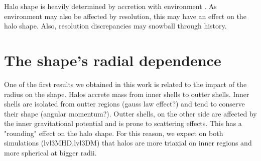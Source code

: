 Halo shape is heavily determined by accretion with environment \cite{shape relation with environment}. As environment may also be affected by resolution, this may have an effect on the halo shape. Also, resolution discrepancies may snowball through history.

\section{The shape's radial dependence}
One of the first results we obtained in this work is related to the impact of the radius on the shape. Halos accrete mass from inner shells to outter shells. Inner shells are isolated from outter regions (gauss law effect?) and tend to conserve their shape (angular momentum?). Outter shells, on the other side are affected by the inner gravitational potential and is prone to scattering effects. This has a "rounding" effect on the halo shape. For this reason, we expect on both simulations (lvl3MHD,lvl3DM) that halos are more triaxial on inner regions and more spherical at bigger radii.\\


